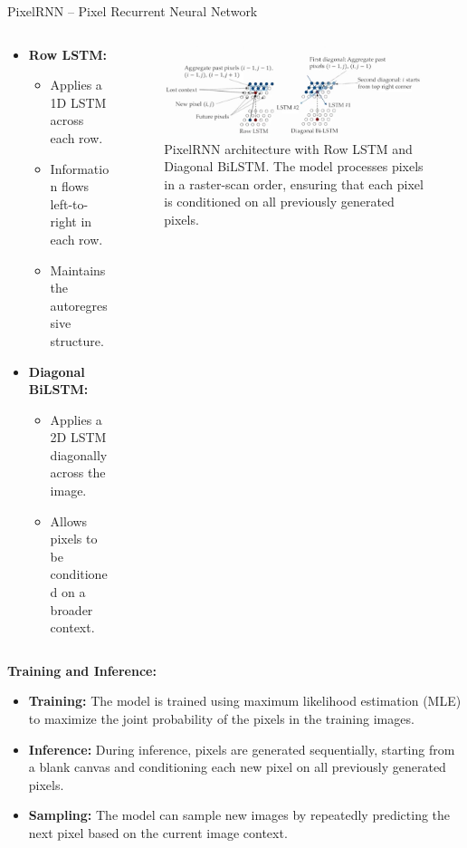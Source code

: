 \begin{frame}[allowframebreaks]{PixelRNN – Pixel Recurrent Neural Network}
\begin{columns}
\begin{column}{0.4\textwidth}
            \begin{itemize}
                \item \textbf{Row LSTM:}
                \begin{itemize}
                    \item Applies a 1D LSTM across each row.
                    \item Information flows left-to-right in each row.
                    \item Maintains the autoregressive structure.
                \end{itemize}

                \item \textbf{Diagonal BiLSTM:}
                \begin{itemize}
                    \item Applies a 2D LSTM diagonally across the image.
                    \item Allows pixels to be conditioned on a broader context.
                \end{itemize}
            \end{itemize}
        \end{column}
        \begin{column}{0.6\textwidth}
            \begin{figure}
                \centering
                \includegraphics[width=1.1\textwidth,keepaspectratio]{images/autoregressive/pixel-rnn-networks.png}
                \caption*{PixelRNN architecture with Row LSTM and Diagonal BiLSTM. The model processes pixels in a raster-scan order, ensuring that each pixel is conditioned on all previously generated pixels.}
            \end{figure}
        \end{column}
    \end{columns}

    \framebreak
    \textbf{Training and Inference:}
    \begin{itemize}
        \item \textbf{Training:} The model is trained using maximum likelihood estimation (MLE) to maximize the joint probability of the pixels in the training images.
        \item \textbf{Inference:} During inference, pixels are generated sequentially, starting from a blank canvas and conditioning each new pixel on all previously generated pixels.
        \item \textbf{Sampling:} The model can sample new images by repeatedly predicting the next pixel based on the current image context.
    \end{itemize}


\end{frame}
